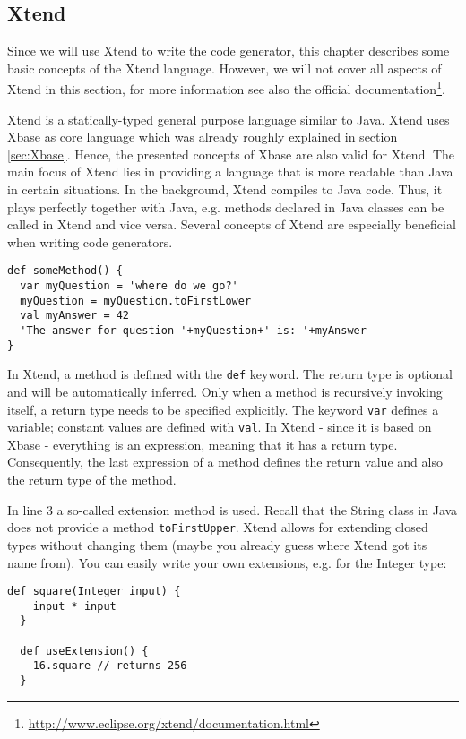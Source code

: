 \subsection{Xtend} \label{sec:Xtend}
 
Since we will use Xtend to write the code generator, this chapter describes some
basic concepts of the Xtend language. However, we will not cover all aspects of
Xtend in this section, for more information see also the official documentation\footnote{\url{http://www.eclipse.org/xtend/documentation.html}}.

Xtend is a statically-typed general purpose language similar to Java. Xtend uses
Xbase as core language which was already roughly explained in section \ref{sec:Xbase}.
Hence, the presented concepts of Xbase are also valid for Xtend. The main focus
of Xtend lies in providing a language that is more readable than Java in certain
situations. In the background, Xtend compiles to Java code. Thus, it plays
perfectly together with Java, e.g. methods declared in Java classes can be called in Xtend
and vice versa. Several concepts of Xtend are especially beneficial when writing code
generators. 

\begin{lstlisting}[language=Xtend]
def someMethod() {
  var myQuestion = 'where do we go?'
  myQuestion = myQuestion.toFirstLower
  val myAnswer = 42
  'The answer for question '+myQuestion+' is: '+myAnswer
}
\end{lstlisting}

In Xtend, a method is defined with the \texttt{def} keyword. The return type is
optional and will be automatically inferred. Only when a method is recursively
invoking itself, a return type needs to be specified explicitly. The keyword 
\texttt{var} defines a variable; constant values are defined with \texttt{val}.
In Xtend - since it is based on Xbase - everything is an expression, meaning that 
it has a return type. Consequently, the last expression of a method defines the
return value and also the return type of the method.

In line 3 a so-called extension method is used. Recall that the String class in 
Java does not provide a method \texttt{toFirstUpper}. Xtend allows for extending
closed types without changing them (maybe you already guess where Xtend got its
name from).
You can easily write your own extensions, e.g. for the Integer type:

\begin{lstlisting}[language=Xtend]
  def square(Integer input) {
  	input * input
  }
  
  def useExtension() {
  	16.square // returns 256
  }
\end{lstlisting}


